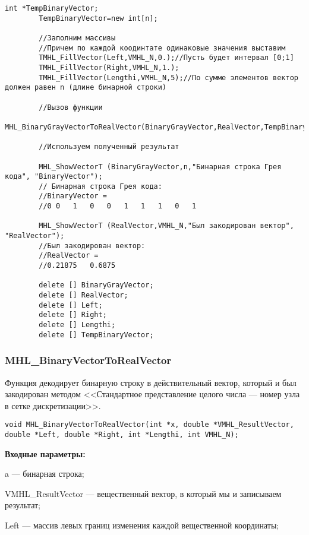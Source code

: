 \documentclass[a4paper,12pt]{article}
\begin{document}
\begin{lstlisting}[label=code_use_MHL_BinaryGrayVectorToRealVector,caption=Пример использования]
        int *TempBinaryVector;
        TempBinaryVector=new int[n];

        //Заполним массивы
        //Причем по каждой коодинтате одинаковые значения выставим
        TMHL_FillVector(Left,VMHL_N,0.);//Пусть будет интервал [0;1]
        TMHL_FillVector(Right,VMHL_N,1.);
        TMHL_FillVector(Lengthi,VMHL_N,5);//По сумме элементов вектор должен равен n (длине бинарной строки)

        //Вызов функции
        MHL_BinaryGrayVectorToRealVector(BinaryGrayVector,RealVector,TempBinaryVector,Left,Right,Lengthi,VMHL_N);

        //Используем полученный результат

        MHL_ShowVectorT (BinaryGrayVector,n,"Бинарная строка Грея кода", "BinaryVector");
        // Бинарная строка Грея кода:
        //BinaryVector =
        //0	0	1	0	0	1	1	1	0	1

        MHL_ShowVectorT (RealVector,VMHL_N,"Был закодирован вектор", "RealVector");
        //Был закодирован вектор:
        //RealVector =
        //0.21875	0.6875

        delete [] BinaryGrayVector;
        delete [] RealVector;
        delete [] Left;
        delete [] Right;
        delete [] Lengthi;
        delete [] TempBinaryVector;
\end{lstlisting}

\subsubsection{MHL\_BinaryVectorToRealVector}\label{MHL_BinaryVectorToRealVector}

Функция декодирует бинарную строку в действительный вектор, который и был закодирован методом <<Стандартное представление целого числа --- номер узла в сетке дискретизации>>.


\begin{lstlisting}[label=code_syntax_MHL_BinaryVectorToRealVector,caption=Синтаксис]
void MHL_BinaryVectorToRealVector(int *x, double *VMHL_ResultVector, double *Left, double *Right, int *Lengthi, int VMHL_N);
\end{lstlisting}

\textbf{Входные параметры:}
 
a --- бинарная строка;
 
VMHL\_ResultVector --- вещественный вектор, в который мы и записываем результат;
 
Left --- массив левых границ изменения каждой вещественной координаты;
 
\end{document}
